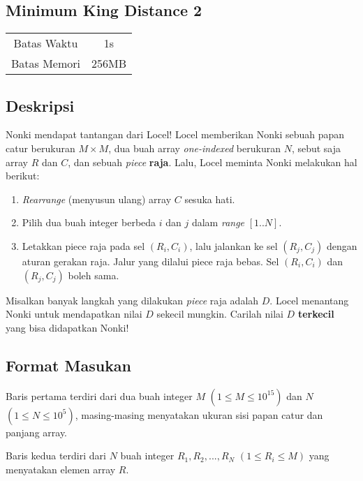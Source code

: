\documentclass{article}
\begin{document}
\begin{center}
    \section*{Minimum King Distance 2} %

    \begin{tabular}{ | c c | }
        \hline
        Batas Waktu  & 1s \\    %
        Batas Memori & 256MB \\  %
        \hline
    \end{tabular}
\end{center}

\subsection*{Deskripsi}
Nonki mendapat tantangan dari Locel! Locel memberikan Nonki sebuah papan catur berukuran $M \times M$, dua buah array \textit{one-indexed} berukuran $N$, sebut saja array $R$ dan $C$, dan sebuah \textit{piece} \textbf{raja}. Lalu, Locel meminta Nonki melakukan hal berikut:

\begin{enumerate}
\item \textit{Rearrange} (menyusun ulang) array $C$ sesuka hati.
\item Pilih dua buah integer berbeda $i$ dan $j$ dalam \textit{range} $[1..N]$.
\item Letakkan piece raja pada sel $(R_i,C_i)$, lalu jalankan ke sel $(R_j,C_j)$ dengan aturan gerakan raja. Jalur yang dilalui piece raja bebas. Sel $(R_i,C_i)$ dan $(R_j,C_j)$ boleh sama.
\end{enumerate}

Misalkan banyak langkah yang dilakukan \textit{piece} raja adalah $D$. Locel menantang Nonki untuk mendapatkan nilai $D$ sekecil mungkin. Carilah nilai $D$ \textbf{terkecil} yang bisa didapatkan Nonki!

\subsection*{Format Masukan}
Baris pertama terdiri dari dua buah integer $M$ $(1 \leq M \leq 10^{15})$ dan $N$ $(1 \leq N \leq 10^5)$, masing-masing menyatakan ukuran sisi papan catur dan panjang array. 

Baris kedua terdiri dari $N$ buah integer $R_1,R_2,...,R_N$ $(1 \leq R_i \leq M)$ yang menyatakan elemen array $R$.
\end{document}
